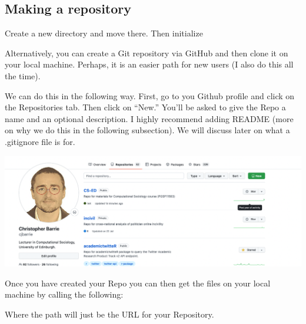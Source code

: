 \documentclass[
  letterpaper,
  DIV=11,
  numbers=noendperiod]{scrreprt}
\newenvironment{Shaded}{\begin{snugshade}}{\end{snugshade}}
\newcommand{\CommentTok}[1]{\textcolor[rgb]{0.37,0.37,0.37}{#1}}
\newcommand{\ExtensionTok}[1]{\textcolor[rgb]{0.00,0.23,0.31}{#1}}
\newcommand{\NormalTok}[1]{\textcolor[rgb]{0.00,0.23,0.31}{#1}}
\begin{document}
\hypertarget{making-a-repository}{%
\subsection*{Making a repository}\label{making-a-repository}}

Create a new directory and move there. Then initialize

\begin{Shaded}
\end{Shaded}

Alternatively, you can create a Git repository via GitHub and then clone
it on your local machine. Perhaps, it is an easier path for new users (I
also do this all the time).

We can do this in the following way. First, go to you Github profile and
click on the Repositories tab. Then click on ``New.'' You'll be asked to
give the Repo a name and an optional description. I highly recommend
adding README (more on why we do this in the following subsection). We
will discuss later on what a .gitignore file is for.

\includegraphics{./images/githubrepo.png}

Once you have created your Repo you can then get the files on your local
machine by calling the following:

\begin{Shaded}
\end{Shaded}

Where the path will just be the URL for your Repository.
\end{document}

